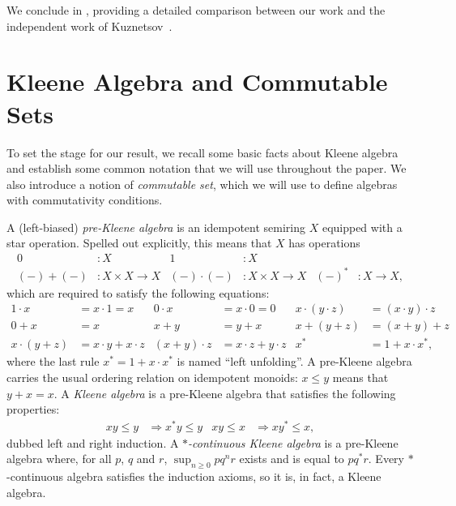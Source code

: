 \documentclass[a4paper,UKenglish,cleveref, autoref, thm-restate]{lipics-v2021}
\begin{document}
We conclude in , providing a detailed comparison between
our work and the independent work of Kuznetsov~\cite{Kuznetsov23}.

\section{Kleene Algebra and Commutable Sets}
\label{sec:preliminaries}

To set the stage for our result, we recall some basic facts about Kleene algebra
and establish some common notation that we will use throughout the paper.  We
also introduce a notion of \emph{commutable set}, which we will use to define
algebras with commutativity conditions.

A (left-biased) \emph{pre-Kleene algebra} is an idempotent semiring $X$
equipped with a star operation. Spelled out explicitly, this means that $X$ has
operations
\begin{align*}
  0 & : X &
  1 & : X \\
  (-)+(-) & : X \times X \to X &
  (-)\cdot(-) & : X \times X \to X &
  (-)^* & : X \to X,
\end{align*}
which are required to satisfy the following equations:
\begin{align*}
  1 \cdot x & = x \cdot 1 = x & 
  0 \cdot x & = x \cdot 0 = 0 &
  x \cdot (y \cdot z) & = (x \cdot y) \cdot z \\
  0 + x & = x & 
  x + y & = y + x &
  x + (y + z) & = (x + y) + z \\
  x \cdot (y + z) & = x \cdot y + x \cdot z & 
  (x + y) \cdot z & = x \cdot z + y \cdot z &
  x^* & = 1 + x \cdot x^*,
\end{align*}
where the last rule \(x^* = 1 + x \cdot x^*\) is named ``left unfolding''.  A
pre-Kleene algebra carries the usual ordering relation on idempotent monoids:
$x \leq y$ means that $y + x = x$.  A \emph{Kleene algebra} is a pre-Kleene
algebra that satisfies the following properties:
\begin{align*}
  xy \le y & \Rightarrow x^*y \le y & xy \le x & \Rightarrow xy^* \le x,
\end{align*}
dubbed left and right induction.  A \emph{$*$-continuous Kleene algebra} is a
pre-Kleene algebra where, for all $p$, $q$ and $r$, $\sup_{n \geq 0}pq^nr$
exists and is equal to $pq^*r$.  Every $*$-continuous algebra satisfies the
induction axioms, so it is, in fact, a Kleene algebra.
\end{document}
